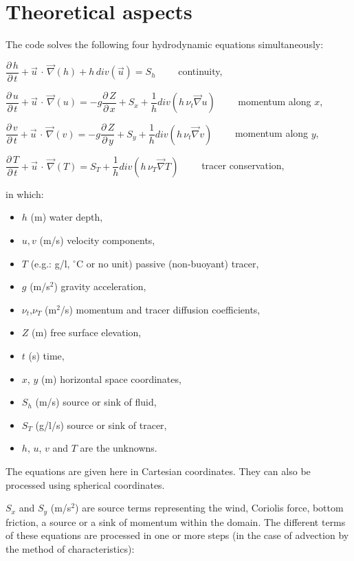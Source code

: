 \chapter{Theoretical aspects}
\label{ch:theo:asp}
The  code solves the following four hydrodynamic equations
simultaneously:


$\dfrac{\partial \, h}{\partial \, t} +\vec{u}\, \cdot \, \vec{\nabla }(h)+h\, div(\vec{u})=S_{h} \qquad$    continuity,


$\dfrac{\partial \, u}{\partial \, t} +\vec{u}\, \cdot \, \vec{\nabla }(u)=-g\dfrac{\partial \, Z}{\partial \, x} +S_{x} +\dfrac{1}{h} div(h\, \nu _{t} \vec{\nabla }u)\qquad$  momentum along $x$,


$\dfrac{\partial \, v}{\partial \, t} +\vec{u}\, \cdot \, \vec{\nabla }(v)=-g\dfrac{\partial \, Z}{\partial \, y} +S_{y} +\dfrac{1}{h} div(h\, \nu _{t} \vec{\nabla }v)\qquad$  momentum along $y$,


$\dfrac{\partial \, T}{\partial \, t} +\vec{u}\, \cdot \, \vec{\nabla }(T)=S_{T} +\dfrac{1}{h} div(h\, \nu _{T} \vec{\nabla }T)\qquad$   tracer conservation,

 
in which:

\begin{itemize}
\item $h$ (m)  water depth,
\item $u,v$ (m/s)  velocity components,
\item $T$ (e.g.: g/l, $^\circ$C or no unit) passive (non-buoyant) tracer,
\item $g$ (m/s$^2$)  gravity acceleration,
\item $\nu_t$,$\nu_T$ (m$^2$/s)  momentum and tracer diffusion coefficients,
\item $Z$ (m)  free surface elevation,
\item $t$ (s)  time,
\item $x$, $y$ (m)  horizontal space coordinates,
\item $S_h$ (m/s)  source or sink of fluid,
\item $S_T$ (g/l/s)  source or sink of tracer,
\item $h$, $u$, $v$ and $T$ are the unknowns.
\end{itemize}

The equations are given here in Cartesian coordinates.
They can also be processed using spherical coordinates.

$S_x$ and $S_y$ (m/s$^2$) are source terms representing the wind, Coriolis force,
bottom friction, a source or a sink of momentum within the domain.
The different terms of these equations are processed in one or more steps
(in the case of advection by the method of characteristics):

